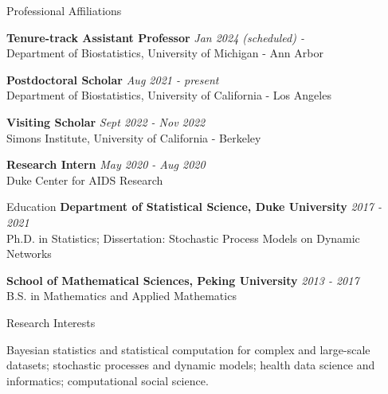 \documentclass{resume} %
\begin{document}

\begin{rSection}{Professional Affiliations}
	
{\bf Tenure-track Assistant Professor} \hfill {\em Jan 2024 (scheduled) - } 
\\ {\small Department of Biostatistics, University of Michigan - Ann Arbor}
	
{\bf Postdoctoral Scholar} \hfill {\em Aug 2021 - present} 
\\ {\small Department of Biostatistics, University of California - Los Angeles}

{\bf Visiting Scholar} \hfill {\em Sept 2022 - Nov 2022} 
\\ {\small Simons Institute, University of California - Berkeley}


{\bf Research Intern} \hfill {\em May 2020 - Aug 2020} 
\\ { \small Duke Center for AIDS Research}
\end{rSection}

\begin{rSection}{Education}
{\bf Department of Statistical Science, Duke University} \hfill {\em 2017 - 2021} 
\\ Ph.D. in Statistics; Dissertation: Stochastic Process Models on Dynamic Networks

{\bf School of Mathematical Sciences, Peking University} \hfill {\em 2013 - 2017} 
\\ B.S. in Mathematics and Applied Mathematics
\end{rSection}

\begin{rSection}{Research Interests}

Bayesian statistics and statistical computation for complex and large-scale datasets; stochastic processes and dynamic models; health data science and informatics; computational social science. %

\end{rSection}




\end{document}
